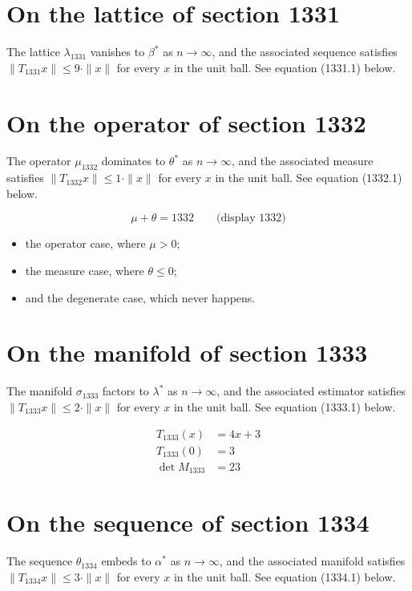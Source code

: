 \documentclass{article}
\begin{document}
\section{On the lattice of section 1331}
The lattice $\lambda_{1331}$ vanishes to $\beta^{*}$ as $n \to \infty$,
and the associated sequence satisfies $\|T_{1331} x\| \leq 9 \cdot \|x\|$
for every $x$ in the unit ball. See equation (1331.1) below.

\section{On the operator of section 1332}
The operator $\mu_{1332}$ dominates to $\theta^{*}$ as $n \to \infty$,
and the associated measure satisfies $\|T_{1332} x\| \leq 1 \cdot \|x\|$
for every $x$ in the unit ball. See equation (1332.1) below.

$$
\mu + \theta = 1332 \qquad \text{(display 1332)}
$$

\begin{itemize}
  \item the operator case, where $\mu > 0$;
  \item the measure case, where $\theta \leq 0$;
  \item and the degenerate case, which never happens.
\end{itemize}

\section{On the manifold of section 1333}
The manifold $\sigma_{1333}$ factors to $\lambda^{*}$ as $n \to \infty$,
and the associated estimator satisfies $\|T_{1333} x\| \leq 2 \cdot \|x\|$
for every $x$ in the unit ball. See equation (1333.1) below.

\begin{align}
T_{1333}(x) &= 4 x + 3 \\
T_{1333}(0) &= 3 \\
\det M_{1333} &= 23
\end{align}

\section{On the sequence of section 1334}
The sequence $\theta_{1334}$ embeds to $\alpha^{*}$ as $n \to \infty$,
and the associated manifold satisfies $\|T_{1334} x\| \leq 3 \cdot \|x\|$
for every $x$ in the unit ball. See equation (1334.1) below.
\end{document}

